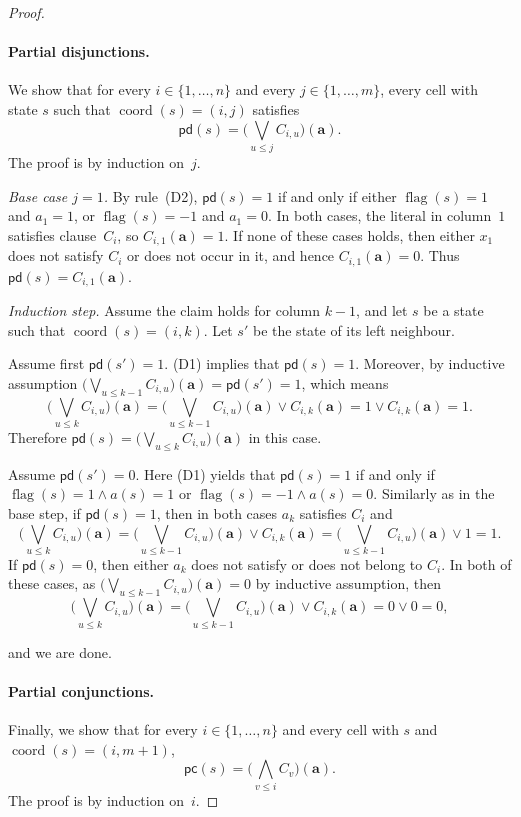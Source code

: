 \documentclass{article}
\theoremstyle{plain}
\theoremstyle{definition}
\DeclareMathOperator{\flag}{flag}
\DeclareMathOperator{\coord}{coord}
\newcommand{\pd}{\mathsf{pd}}
\newcommand{\tuple}{\mathbf}
\begin{document}
\begin{proof}
\paragraph{Partial disjunctions.}
We show that for every $i\in\{1,\dots,n\}$ and every $j\in\{1,\dots,m\}$,
every cell with state $s$ such that $\coord(s)=(i,j)$ satisfies
\[
\mathsf{pd}(s)=\bigl(\bigvee_{u\le j} C_{i,u}\bigr)(\tuple a).
\]
The proof is by induction on~$j$.

\emph{Base case $j=1$.}
By rule~(D2), $\mathsf{pd}(s)=1$ if and only if either
$\flag(s)=1$ and $a_1=1$, or $\flag(s)=-1$ and $a_1=0$.
In both cases, the literal in column~$1$ satisfies clause~$C_i$,
so $C_{i,1}(\tuple a)=1$.
If none of these cases holds, then either $x_1$ does not satisfy $C_i$
or does not occur in it, and hence $C_{i,1}(\tuple a)=0$.
Thus $\mathsf{pd}(s)=C_{i,1}(\tuple a)$.

\emph{Induction step.}
Assume the claim holds for column $k-1$, and let $s$ be a state such that
$\coord(s) = (i,k)$.  
Let $s'$ be the state of its left neighbour.

Assume first $\mathsf{pd}(s')=1$. (D1) implies that $\mathsf{pd}(s)=1$. Moreover, by inductive assumption $\bigl(\bigvee_{u \leq k-1} C_{i,u}\bigr)(\tuple a) = \pd(s') = 1$, which means  
\[
\bigl(\bigvee_{u \leq k} C_{i,u}\bigr)(\tuple a) = \bigl(\bigvee_{u \leq k-1} C_{i,u}\bigr)(\tuple a) \vee C_{i, k} (\tuple a)= 1 \vee C_{i, k} (\tuple a) =1.
\]
 Therefore $\mathsf{pd}(s) = \bigl(\bigvee_{u \leq k} C_{i,u}\bigr)(\tuple a)$ in this case.

Assume $\pd(s')=0$. Here (D1) yields that $\mathsf{pd}(s)=1$ if and only if $\flag(s)=1\wedge a(s)=1$ or $\flag(s)=-1\wedge a(s)=0$. Similarly as in the base step, if $\mathsf{pd}(s)=1$, then in both cases $a_{k}$ satisfies $C_i$ and 
 \[
 \bigl(\bigvee_{u \leq k} C_{i,u}\bigr)(\tuple a) = \bigl(\bigvee_{u \leq k-1} C_{i,u}\bigr)(\tuple a) \vee C_{i,k}(\tuple a) = \bigl(\bigvee_{u \leq k-1} C_{i,u}\bigr)(\tuple a) \vee 1=1.
 \]
   If $\mathsf{pd}(s)=0$, then either $a_{k}$ does not satisfy or does not belong to $C_i$. In both of these cases, as $\bigl(\bigvee_{u \leq k-1} C_{i,u}\bigr)(\tuple a) =0$ by inductive assumption, then 
    \[
 \bigl(\bigvee_{u \leq k} C_{i,u}\bigr)(\tuple a) = \bigl(\bigvee_{u \leq k-1} C_{i,u}\bigr)(\tuple a) \vee C_{i,k}(\tuple a) = 0 \vee 0=0,
 \]
   
 and we are done.

\paragraph{Partial conjunctions.}
Finally, we show that for every $i\in\{1,\dots,n\}$ and every cell with $s$ and
$\coord(s)=(i,m+1)$,
\[
\mathsf{pc}(s)=\bigl(\bigwedge_{v\le i} C_v\bigr)(\tuple a).
\]
The proof is by induction on~$i$.


\end{proof}
\end{document}
